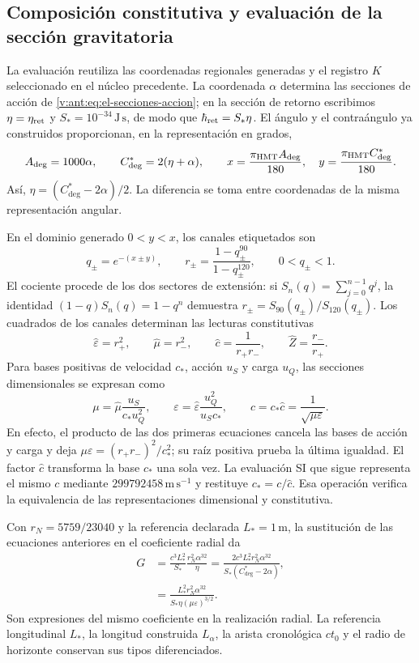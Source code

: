 \subsection{Composición constitutiva y evaluación de la sección gravitatoria}
\label{g26:subsec:evaluacion-viii-es}

La evaluación reutiliza las coordenadas regionales generadas y el registro
\(K\) seleccionado en el núcleo precedente. La coordenada \(\alpha\)
determina las secciones de acción de
\eqref{v:ant:eq:el-secciones-accion}; en la sección de retorno escribimos
\(\eta=\eta_{\rm ret}\) y \(S_*=10^{-34}\,\mathrm{J\,s}\), de modo
que \(\hbar_{\rm ret}=S_*\eta\). El ángulo y el contraángulo ya
construidos proporcionan, en la representación en grados,
\[
 A_{\deg}=1000\alpha,\qquad C^*_{\deg}=2(\eta+\alpha),\qquad
 x=\frac{\pi_{\rm HMT}A_{\deg}}{180},\quad
 y=\frac{\pi_{\rm HMT}C^*_{\deg}}{180}.
\]
Así, \(\eta=(C^*_{\deg}-2\alpha)/2\). La diferencia se toma entre
coordenadas de la misma representación angular.

En el dominio generado \(0<y<x\), los canales etiquetados son
\[
 q_\pm=e^{-(x\pm y)},\qquad
 r_\pm=\frac{1-q_\pm^{90}}{1-q_\pm^{120}},\qquad
 0<q_\pm<1.
\]
El cociente procede de los dos sectores de extensión: si
\(S_n(q)=\sum_{j=0}^{n-1}q^j\), la identidad
\((1-q)S_n(q)=1-q^n\) demuestra
\(r_\pm=S_{90}(q_\pm)/S_{120}(q_\pm)\).
Los cuadrados de los canales determinan las lecturas constitutivas
\[
 \widehat\varepsilon=r_+^2,\qquad
 \widehat\mu=r_-^2,\qquad
 \widehat c=\frac1{r_+r_-},\qquad
 \widehat Z=\frac{r_-}{r_+}.
\]
Para bases positivas de velocidad \(c_*\), acción \(u_S\) y carga
\(u_Q\), las secciones dimensionales se expresan como
\[
 \mu=\widehat\mu\frac{u_S}{c_*u_Q^2},\qquad
 \varepsilon=\widehat\varepsilon\frac{u_Q^2}{u_Sc_*},\qquad
 c=c_*\widehat c=\frac1{\sqrt{\mu\varepsilon}}.
\]
En efecto, el producto de las dos primeras ecuaciones cancela las bases
de acción y carga y deja
\(\mu\varepsilon=(r_+r_-)^2/c_*^2\); su raíz positiva prueba la
última igualdad. El factor \(\widehat c\) transforma la base \(c_*\)
una sola vez. La evaluación SI que sigue representa el mismo \(c\)
mediante \(299792458\,\mathrm{m\,s^{-1}}\) y restituye
\(c_*=c/\widehat c\). Esa operación verifica la equivalencia de las
representaciones dimensional y constitutiva.

Con \(r_N=5759/23040\) y la referencia declarada \(L_*=1\,\mathrm m\),
la sustitución de las ecuaciones anteriores en el coeficiente radial da
\begin{align}
 G&=\frac{c^3L_*^2}{S_*}\frac{r_N^2\alpha^{32}}{\eta}
   =\frac{2c^3L_*^2r_N^2\alpha^{32}}
           {S_*(C^*_{\deg}-2\alpha)},\label{g26:eq:g-angular-viii-es}\\
  &=\frac{L_*^2r_N^2\alpha^{32}}
           {S_*\eta(\mu\varepsilon)^{3/2}}.
 \label{g26:eq:g-constitutivo-viii-es}
\end{align}
Son expresiones del mismo coeficiente en la realización radial. La
referencia longitudinal \(L_*\), la longitud construida \(L_\alpha\),
la arista cronológica \(ct_0\) y el radio de horizonte conservan sus
tipos diferenciados.

